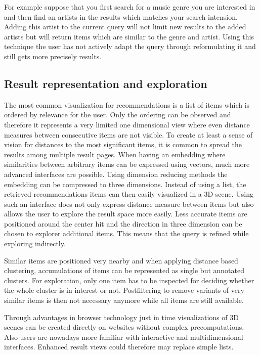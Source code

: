 \documentclass[a4paper]{llncs}
\begin{document}
	For example suppose that you first search for a music genre you are interested in and then find an artists in the results which matches your search intension. Adding this artist to the current query will not limit new results to the added artists but will return items which are similar to the genre and artist. Using this technique the user has not actively adapt the query through reformulating it and still gets more precisely results. \\
	
	\subsection{Result representation and exploration}
	
	The most common visualization for recommendations is a list of items which is ordered by relevance for the user. Only the ordering can be observed and therefore it represents a very limited one dimensional view where even distance measures between consecutive items are not visible. To create at least a sense of vision for distances to the most significant items, it is common to spread the results among multiple result pages. 
	When having an embedding where similarities between arbitrary items can be expressed using vectors, much more advanced interfaces are possible. Using dimension reducing methods the embedding can be compressed to three dimensions. Instead of using a list, the retrieved recommendations items can then easily visualized in a 3D scene. Using such an interface does not only express distance measure between items but also allows the user to explore the result space more easily. Less accurate items are positioned around the center hit and the direction in three dimension can be chosen to explorer additional items. This means that the query is refined while exploring indirectly.
	
	Similar items are positioned very nearby and when applying distance based clustering, accumulations of items can be represented as single but annotated clusters. For exploration, only one item has to be inspected for deciding whether the whole cluster is in interest or not. Postfiltering to remove variants of very similar items is then not necessary anymore while all items are still available.
	
	Through advantages in browser technology just in time visualizations of 3D scenes can be created directly on websites without complex precomputations. Also users are nowadays more familiar with interactive and multidimensional interfaces. Enhanced result views could therefore may replace simple lists.
	
\end{document}
